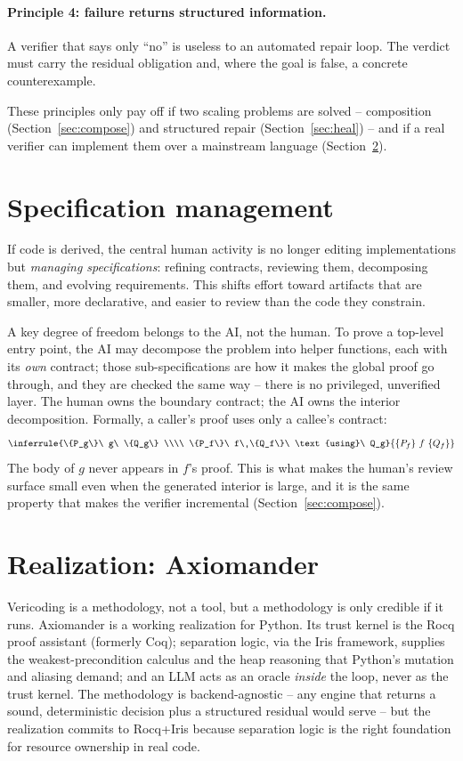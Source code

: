 \documentclass[sigconf,nonacm]{acmart}
\newcommand{\hoare}[3]{\{#1\}\ #2\ \{#3\}}
\begin{document}
\paragraph{Principle 4: failure returns structured information.} A verifier that
says only ``no'' is useless to an automated repair loop. The verdict must carry
the residual obligation and, where the goal is false, a concrete counterexample.

These principles only pay off if two scaling problems are solved -- composition
(Section~\ref{sec:compose}) and structured repair (Section~\ref{sec:heal}) -- and
if a real verifier can implement them over a mainstream language
(Section~\ref{sec:axiomander}).

\section{Specification management}
\label{sec:specmgmt}

If code is derived, the central human activity is no longer editing
implementations but \emph{managing specifications}: refining contracts, reviewing
them, decomposing them, and evolving requirements. This shifts effort toward
artifacts that are smaller, more declarative, and easier to review than the code
they constrain.

A key degree of freedom belongs to the AI, not the human. To prove a top-level
entry point, the AI may decompose the problem into helper functions, each with
its \emph{own} contract; those sub-specifications are how it makes the global
proof go through, and they are checked the same way -- there is no privileged,
unverified layer. The human owns the boundary contract; the AI owns the interior
decomposition. Formally, a caller's proof uses only a callee's contract:
\[
\inferrule{\hoare{P_g}{g}{Q_g} \\\\ \hoare{P_f}{f}{Q_f}\ \text{using}\ Q_g}
{\hoare{P_f}{f}{Q_f}}
\]
The body of $g$ never appears in $f$'s proof. This is what makes the human's
review surface small even when the generated interior is large, and it is the
same property that makes the verifier incremental (Section~\ref{sec:compose}).

\section{Realization: Axiomander}
\label{sec:axiomander}

Vericoding is a methodology, not a tool, but a methodology is only credible if it
runs. Axiomander is a working realization for Python. Its trust kernel is the
Rocq proof assistant (formerly Coq); separation logic, via the Iris framework,
supplies the weakest-precondition calculus and the heap reasoning that Python's
mutation and aliasing demand; and an LLM acts as an oracle \emph{inside} the
loop, never as the trust kernel. The methodology is backend-agnostic -- any
engine that returns a sound, deterministic decision plus a structured residual
would serve -- but the realization commits to Rocq{+}Iris because separation
logic is the right foundation for resource ownership in real code.
\end{document}
